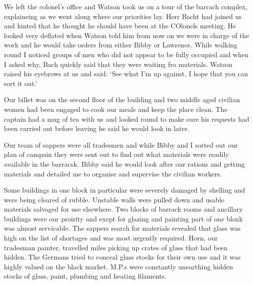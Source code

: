 We left the colonel's office and \captain Watson took us on a tour of
the barrach complex, explaineing as we went along where our priorities
lay. Herr Bacht had joined us and hinted that he thought he should
have been at the COlonels meeting. He looked very deflated when
\captain Watson told him from now on we were in charge of the work and
he would take orders from either \lsergeant Bibby or \lcorporal Lawrence. While
walking round I noticed groups of men who did not appear to be fully
occupied and when I asked why, Bach quickly said that they were
waiting fro materials. \Captain Watson raised his eyebrows at us and
said: `See what I'm up against, I hope that you can sort it out.'

Our billet was on the second floor of the building and two middle aged
civilian women had been engaged to cook our meals and keep the place
clean. The captain had a mug of tea with us and looked round to make
sure his requests had been carried out before leaving he said he would
look in later.

Our team of sappers were all tradesmen and while Bibby and I sorted out
our plan of campain they were sent out to find out what materials were
readily available in the barracsk. Bibby said he would look after our
rations and getting materials and detailed me to organise and
supervise the civilian workers.

Some buildings in one block in particular were severely damaged by
shelling and were being cleared of rubble. Unstable walls were pulled
down and usable materials salvaged for use elsewhere. Two blocks of
barrack rooms and ancillary buildings were our proirity and exept for
glazing and painting part of one bloxk was almost servicable. The
sappers search for materials revealed that glass was high on the list
of shortages and was most urgently required. \Sapper Horn, our
tradesman painter, travelled miles picking up crates of glass that had
been hidden. The Germans tried to conceal glass stocks for their own
use and it was highly valued on the black market. M.P.s were
constantly unearthing hidden stocks of glass, paint, plumbing and
heating filaments.

